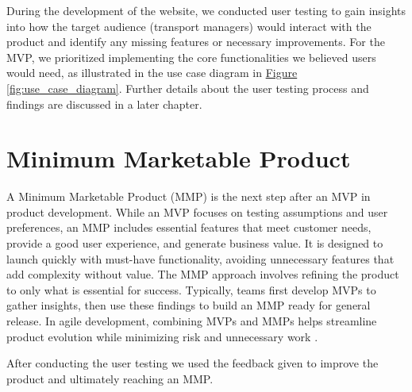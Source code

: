 During the development of the website, we conducted user testing to gain insights into how the target audience (transport managers) would interact with the product and identify any missing features or necessary improvements. For the MVP, we prioritized implementing the core functionalities we believed users would need, as illustrated in the use case diagram in \hyperref[fig:use_case_diagram]{Figure \ref*{fig:use_case_diagram}}. Further details about the user testing process and findings are discussed in a later chapter.

\section{Minimum Marketable Product}

A Minimum Marketable Product (MMP) is the next step after an MVP in product development. While an MVP focuses on testing assumptions and user preferences, an MMP includes essential features that meet customer needs, provide a good user experience, and generate business value. It is designed to launch quickly with must-have functionality, avoiding unnecessary features that add complexity without value. The MMP approach involves refining the product to only what is essential for success. Typically, teams first develop MVPs to gather insights, then use these findings to build an MMP ready for general release. In agile development, combining MVPs and MMPs helps streamline product evolution while minimizing risk and unnecessary work \cite{wanner_mmp}. 

After conducting the user testing we used the feedback given to improve the product and ultimately reaching an MMP. 

